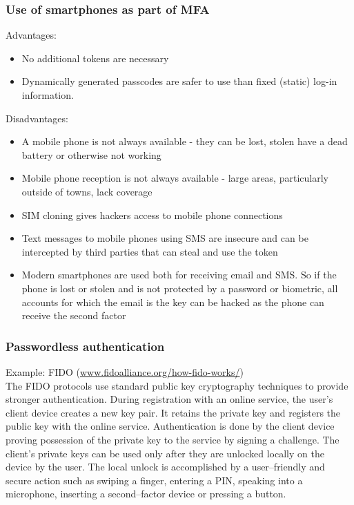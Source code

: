 \documentclass[a4paper, 10pt, titlepage]{article}
\begin{document}
\subsubsection{Use of smartphones as part of MFA}
Advantages:
\begin{itemize}
\item No additional tokens are necessary
\item Dynamically generated passcodes are safer to use than fixed (static) log-in information.
\end{itemize}
Disadvantages:
\begin{itemize}
\item A mobile phone is not always available - they can be lost, stolen have a dead battery or otherwise not working
\item Mobile phone reception is not always available - large areas, particularly outside of towns, lack coverage
\item SIM cloning gives hackers access to mobile phone connections
\item Text messages to mobile phones using SMS are insecure and can be intercepted by third parties that can steal and use the token
\item Modern smartphones are used both for receiving email and SMS. So if the phone is lost or stolen and is not protected by a password or biometric, all accounts for which the email is the key can be hacked as the phone can receive the second factor
\end{itemize}

\subsubsection{Passwordless authentication}
Example: FIDO (\url{www.fidoalliance.org/how-fido-works/}) \\
The FIDO protocols use standard public key cryptography techniques to provide stronger authentication. During registration with an online service, the user’s client device creates a new key pair. It retains the private key and registers the public key with the online service. Authentication is done by the client device proving possession of the private key to the service by signing a challenge. The client’s private keys can be used only after they are unlocked locally on the device by the user. The local unlock is accomplished by a user–friendly and secure action such as swiping a finger, entering a PIN, speaking into a microphone, inserting a second–factor device or pressing a button.
\end{document}
